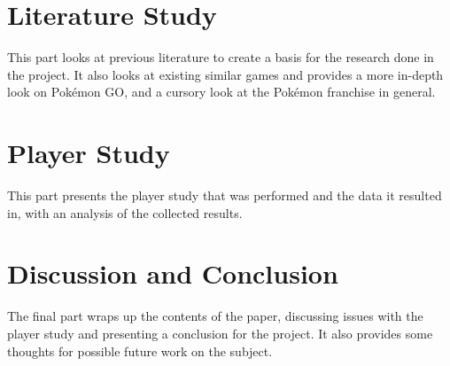 \documentclass[12pt, oneside]{Thesis} %
\begin{document}
{\label{part:intro}


\part{Literature Study}
This part looks at previous literature to create a basis for the research done in the project. It also looks at existing similar games and provides a more in-depth look on Pokémon GO, and a cursory look at the Pokémon franchise in general.

\label{part:literature-study}
 

\part{Player Study}
This part presents the player study that was performed and the data it resulted in, with an analysis of the collected results.

\label{part:player-study}




\part{Discussion and Conclusion}
The final part wraps up the contents of the paper, discussing issues with the player study and presenting a conclusion for the project. It also provides some thoughts for possible future work on the subject.

\label{part:discussion-and-conclusion}





\appendix %




%
%

}
\end{document}
